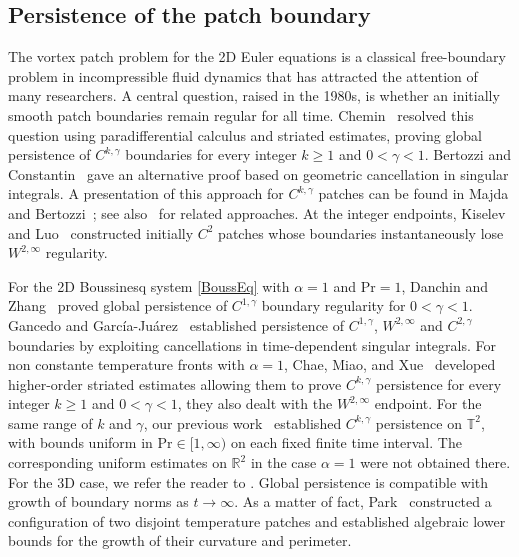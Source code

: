 \documentclass[reqno,11pt,a4paper]{amsart}
\begin{document}
\subsection{Persistence of the patch boundary}\label{subsec:intr-patch-bdr}
The vortex patch problem for the 2D Euler equations is
a classical free-boundary problem in incompressible fluid
dynamics that has attracted the attention of many researchers.
A central question, raised in the 1980s, is whether
an initially smooth patch boundaries remain regular for all time.
Chemin~\cite{Chem93} resolved this question using
paradifferential calculus and striated estimates,
proving global persistence of $C^{k,\gamma}$ boundaries
for every integer $k\geq1$ and $0<\gamma<1$.
Bertozzi and Constantin~\cite{BerC} gave an alternative
proof based on geometric cancellation in singular integrals.
A presentation of this approach for $C^{k,\gamma}$ patches
can be found in Majda and Bertozzi~\cite[Section~8.3]{MB02};
see also~\cite{Serf94,Radu22} for related approaches.
At the integer endpoints, Kiselev and Luo~\cite{KL23}
constructed initially $C^2$ patches whose boundaries
instantaneously lose $W^{2,\infty}$ regularity.

For the 2D Boussinesq system \eqref{BoussEq} with $\alpha=1$ and
$\mathrm{Pr}=1$, Danchin and Zhang~\cite{DZ17}
proved global persistence of $C^{1,\gamma}$ boundary
regularity for $0<\gamma<1$.
Gancedo and Garc\'ia-Ju\'arez~\cite{GGJ17}
established persistence of $C^{1,\gamma}$, $W^{2,\infty}$ and
$C^{2,\gamma}$ boundaries by exploiting cancellations
in time-dependent singular integrals.
For non constante temperature fronts with $\alpha=1$,
Chae, Miao, and Xue~\cite{CMX22} developed higher-order
striated estimates allowing them to prove $C^{k,\gamma}$ persistence
for every integer $k\geq1$ and $0<\gamma<1$,
they also dealt with the $W^{2,\infty}$ endpoint.
For the same range of $k$ and $\gamma$,
our previous work~\cite{LXY25} established
$C^{k,\gamma}$ persistence on $\mathbb T^2$,
with bounds uniform in $\mathrm{Pr}\in[1,\infty)$
on each fixed finite time interval.
The corresponding uniform estimates on $\mathbb R^2$
in the case $\alpha=1$ were not obtained there.
For the 3D case, we refer the reader to
\cite{GGJ20,LLX24,MY26}.
Global persistence is compatible with growth of boundary
norms as $t\to\infty$. As a matter of fact, Park~\cite{Park24} constructed
a configuration of two disjoint temperature patches
and established algebraic lower bounds for the growth
of their curvature and perimeter.
\end{document}
